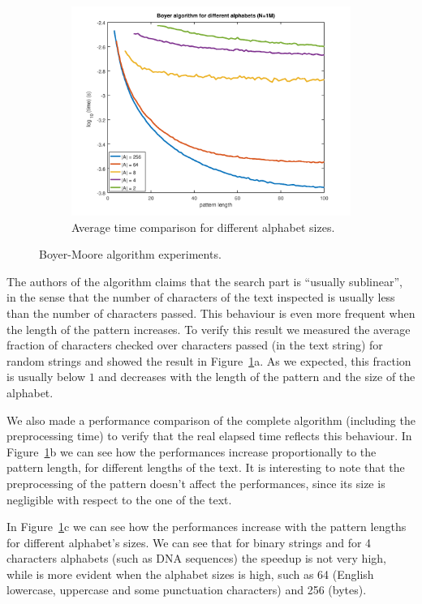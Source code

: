 \documentclass{article}
\begin{document}
\begin{figure}
\begin{subfigure}[b]{0.5\linewidth}
    \includegraphics[width=\linewidth]{boyer2.png}
    \caption{Average time comparison for different alphabet sizes.}
  \end{subfigure}
  \caption{Boyer-Moore algorithm experiments.}
  \label{fig:boyer}
\end{figure}

The authors of the algorithm claims that the search part is ``usually sublinear'', in the sense that the number of characters of the text inspected is usually less than the number of characters passed. This behaviour is even more frequent when the length of the pattern increases. To verify this result we measured the average fraction of characters checked over characters passed (in the text string) for random strings and showed the result in Figure~\ref{fig:boyer}a. As we expected, this fraction is usually below $1$ and decreases with the length of the pattern and the size of the alphabet.

We also made a performance comparison of the complete algorithm (including the preprocessing time) to verify that the real elapsed time reflects this behaviour. In Figure~\ref{fig:boyer}b we can see how the performances increase proportionally to the pattern length, for different lengths of the text. It is interesting to note that the preprocessing of the pattern doesn't affect the performances, since its size is negligible with respect to the one of the text.

In Figure~\ref{fig:boyer}c we can see how the performances increase with the pattern lengths for different alphabet's sizes. We can see that for binary strings and for 4 characters alphabets (such as DNA sequences) the speedup is not very high, while is more evident when the alphabet sizes is high, such as 64 (English lowercase, uppercase and some punctuation characters) and 256 (bytes).
\end{document}
